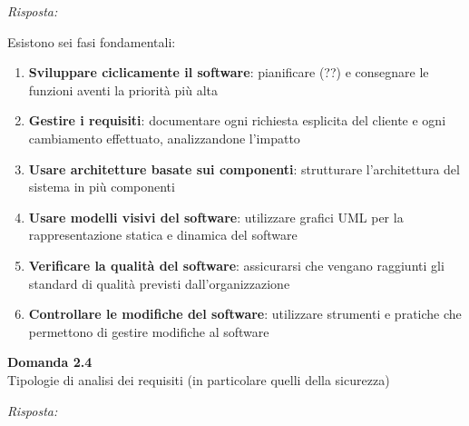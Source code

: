 \documentclass{article}
\newenvironment{problem}[2][Domanda]
    { \begin{mdframed}[backgroundcolor=gray!20] \textbf{#1 #2} \\}
    {  \end{mdframed}}
\newenvironment{solution}
    {\textit{Risposta:}}
    {}
\begin{document}
\begin{solution}
\begin{itemize}
	\newline
	Esistono sei fasi fondamentali:
	\begin{enumerate}
		\item \textbf{Sviluppare ciclicamente il software}: pianificare (??) e consegnare le funzioni aventi la priorità più alta
		\item \textbf{Gestire i requisiti}: documentare ogni richiesta esplicita del cliente e ogni cambiamento effettuato, analizzandone l'impatto
		\item \textbf{Usare architetture basate sui componenti}: strutturare l'architettura del sistema in più componenti
		\item \textbf{Usare modelli visivi del software}: utilizzare grafici UML per la rappresentazione statica e dinamica del software
		\item \textbf{Verificare la qualità del software}: assicurarsi che vengano raggiunti gli standard di qualità previsti dall'organizzazione
		\item \textbf{Controllare le modifiche del software}: utilizzare strumenti e pratiche che permettono di gestire modifiche al software
	\end{enumerate}
\end{itemize}

\end{solution}

\begin{problem}{2.4}
Tipologie di analisi dei requisiti (in particolare quelli della sicurezza)
\end{problem}
\begin{solution}

\end{solution}
\end{document}
